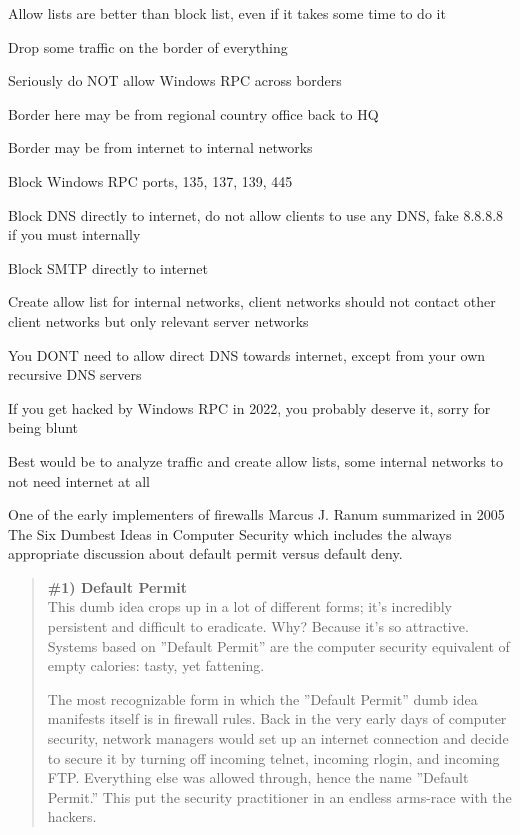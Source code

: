 \documentclass[Screen16to9,17pt]{foils}
\begin{document}
Allow lists are better than block list, even if it takes some time to do it



\begin{list2}
\item Drop some traffic on the border of everything
\item Seriously do NOT allow Windows RPC across borders
\item Border here may be from regional country office back to HQ
\item Border may be from internet to internal networks
\item Block Windows RPC ports, 135, 137, 139, 445
\item Block DNS directly to internet, do not allow clients to use any DNS, fake 8.8.8.8 if you must internally
\item Block SMTP directly to internet
\item Create allow list for internal networks, client networks should not contact other client networks but only relevant server networks
\end{list2}

You DONT need to allow direct DNS towards internet, except from your own recursive DNS servers

If you get hacked by Windows RPC in 2022, you probably deserve it, sorry for being blunt

Best would be to analyze traffic and create allow lists, some internal networks to not need internet at all




One of the early implementers of firewalls Marcus J. Ranum summarized in 2005 The Six Dumbest Ideas in Computer Security  which includes the always appropriate discussion about default permit versus default deny.

\begin{quote}\small {\bf
\#1) Default Permit}\\
This dumb idea crops up in a lot of different forms; it’s incredibly persistent and difficult to eradicate. Why? Because it’s so attractive. Systems based on ”Default Permit” are the computer security equivalent of empty calories: tasty, yet fattening.

The most recognizable form in which the ”Default Permit” dumb idea manifests itself is in firewall rules. Back in the very early days of computer security, network managers would set up an internet connection and decide to secure it by turning off incoming telnet, incoming rlogin, and incoming FTP. Everything else was allowed through, hence the name ”Default Permit.” This put the security practitioner in an endless arms-race with the hackers.
\end{quote}
\end{document}
